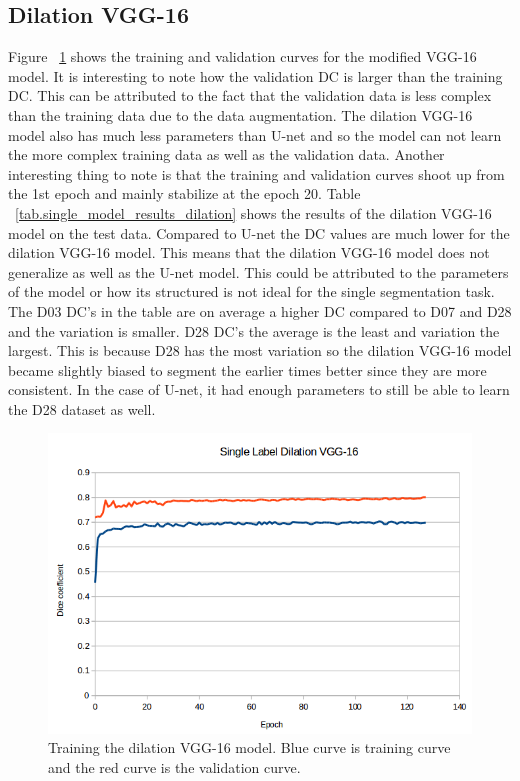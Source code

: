 \subsection{Dilation VGG-16}
    Figure ~\ref{fig:results_single_dilation_train} shows the training and validation curves for the modified VGG-16 model. 
    It is interesting to note how the validation DC is larger than the training DC.
    This can be attributed to the fact that the validation data is less complex than the training data due to the data augmentation. 
    The dilation VGG-16 model also has much less parameters than U-net and so the model can not learn the more complex training data as well as the validation data. 
    Another interesting thing to note is that the training and validation curves shoot up from the 1st epoch and mainly stabilize at the epoch 20. 
    Table ~\ref{tab.single_model_results_dilation} shows the results of the dilation VGG-16 model on the test data. Compared to U-net the DC values are much lower for the dilation VGG-16 model. 
    This means that the dilation VGG-16 model does not generalize as well as the U-net model. 
    This could be attributed to the parameters of the model or how its structured is not ideal for the single segmentation task. 
    The D03 DC's in the table are on average a higher DC compared to D07 and D28 and the variation is smaller. 
    D28 DC's the average is the least and variation the largest.
    This is because D28 has the most variation so the dilation VGG-16 model became slightly biased to segment the earlier times better since they are more consistent.
    In the case of U-net, it had enough parameters to still be able to learn the D28 dataset as well. 

\begin{figure}[!tbh]
\centering
\includegraphics[width=\textwidth]{results/train_results_single_dilation.png}
\caption{Training the dilation VGG-16 model. Blue curve is training curve and the red curve is the validation curve. }
\label{fig:results_single_dilation_train}
\end{figure}

